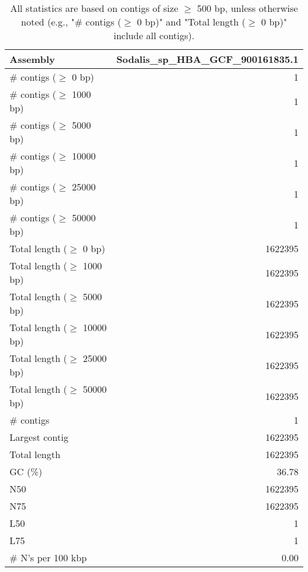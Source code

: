 \documentclass[12pt,a4paper]{article}
\begin{document}
\begin{table}[ht]
\begin{center}
\caption{All statistics are based on contigs of size $\geq$ 500 bp, unless otherwise noted (e.g., "\# contigs ($\geq$ 0 bp)" and "Total length ($\geq$ 0 bp)" include all contigs).}
\begin{tabular}{|l*{1}{|r}|}
\hline
Assembly & Sodalis\_sp\_HBA\_GCF\_900161835.1 \\ \hline
\# contigs ($\geq$ 0 bp) & 1 \\ \hline
\# contigs ($\geq$ 1000 bp) & 1 \\ \hline
\# contigs ($\geq$ 5000 bp) & 1 \\ \hline
\# contigs ($\geq$ 10000 bp) & 1 \\ \hline
\# contigs ($\geq$ 25000 bp) & 1 \\ \hline
\# contigs ($\geq$ 50000 bp) & 1 \\ \hline
Total length ($\geq$ 0 bp) & 1622395 \\ \hline
Total length ($\geq$ 1000 bp) & 1622395 \\ \hline
Total length ($\geq$ 5000 bp) & 1622395 \\ \hline
Total length ($\geq$ 10000 bp) & 1622395 \\ \hline
Total length ($\geq$ 25000 bp) & 1622395 \\ \hline
Total length ($\geq$ 50000 bp) & 1622395 \\ \hline
\# contigs & 1 \\ \hline
Largest contig & 1622395 \\ \hline
Total length & 1622395 \\ \hline
GC (\%) & 36.78 \\ \hline
N50 & 1622395 \\ \hline
N75 & 1622395 \\ \hline
L50 & 1 \\ \hline
L75 & 1 \\ \hline
\# N's per 100 kbp & 0.00 \\ \hline
\end{tabular}
\end{center}
\end{table}
\end{document}
